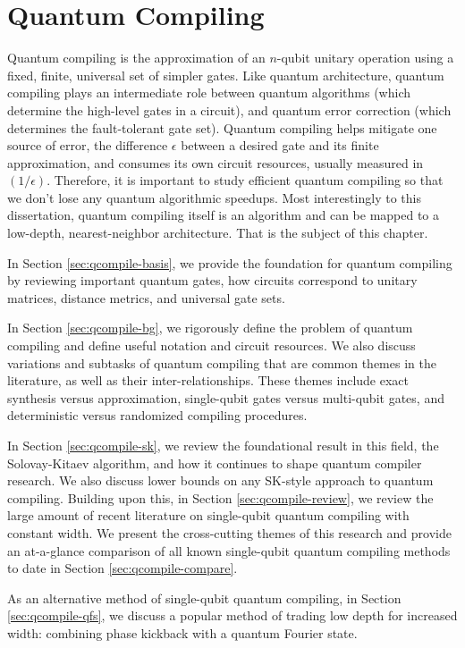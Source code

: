\chapter{Quantum Compiling}
\label{chap:qcompile}

Quantum compiling is the approximation of an $n$-qubit
unitary operation using a fixed, finite, universal set
of simpler gates. Like quantum architecture, quantum
compiling plays an intermediate role between quantum
algorithms (which determine the high-level gates in a circuit),
and quantum error correction (which determines the
fault-tolerant gate set).
Quantum compiling helps mitigate one source of error,
the difference $\epsilon$ between a desired gate and its
finite approximation,
and consumes its own circuit resources, usually measured in
$(1 / \epsilon)$.
Therefore, it is important to study efficient quantum 
compiling so that we don't lose any quantum algorithmic speedups.
Most interestingly to this dissertation, quantum compiling itself
is an algorithm and can be mapped to a low-depth, nearest-neighbor
architecture. That is the subject of this chapter.

In Section \ref{sec:qcompile-basis}, we provide the foundation
for quantum compiling by reviewing important quantum gates,
how circuits correspond to unitary matrices, distance metrics,
and universal gate sets.

In Section \ref{sec:qcompile-bg}, we rigorously define the problem of
quantum compiling and define useful notation and circuit resources.
We also discuss
variations and subtasks of quantum compiling that are common themes
in the literature, as well as their inter-relationships.
These themes include exact synthesis versus approximation,
single-qubit gates versus multi-qubit gates, and deterministic
versus randomized compiling procedures.

In Section \ref{sec:qcompile-sk}, we review the foundational
result in this field, the Solovay-Kitaev algorithm, and how it
continues to shape quantum compiler research. We also discuss
lower bounds on any SK-style approach to quantum compiling.
Building upon this,
in Section \ref{sec:qcompile-review}, we review the large
amount of recent literature on single-qubit quantum compiling with
constant width. We present
the cross-cutting themes of this research and provide an
at-a-glance comparison of all known single-qubit quantum compiling methods
to date in Section \ref{sec:qcompile-compare}.

As an alternative method of single-qubit quantum compiling,
in Section \ref{sec:qcompile-qfs}, we
discuss a popular method of trading low depth for increased
width: combining phase kickback with a quantum Fourier state.

